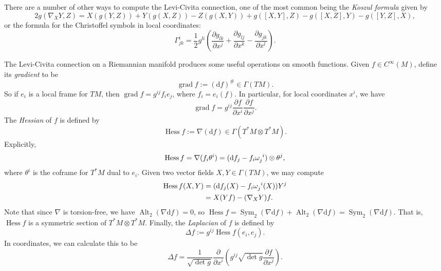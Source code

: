 \documentclass{book}
\renewcommand{\d}{\mathrm{d}}
\newcommand{\parens}[1]{\left( {#1} \right)}
\newcommand{\pdv}[2]{\frac{\partial{#1}}{\partial{#2}}}
\DeclareMathOperator{\Alt}{\mathrm{Alt}}
\DeclareMathOperator{\Sym}{\mathrm{Sym}}
\DeclareMathOperator{\grad}{\mathrm{grad}}
\DeclareMathOperator{\Hess}{\mathrm{Hess}}
\theoremstyle{definition}
\numberwithin{equation}{section}
\begin{document}
There are a number of other ways to compute the Levi-Civita connection, one of the most common being the \textit{Koszul formula} given by 
\begin{equation}
    2g(\nabla_X Y,Z) = X(g(Y,Z)) + Y(g(X,Z)) - Z(g(X,Y)) + g([X,Y],Z) - g([X,Z],Y) - g([Y,Z],X),
\end{equation}
or the formula for the Christoffel symbols in local coordinates:
\begin{equation}
    \Gamma_{jk}^i = \frac{1}{2} g^{li} \parens{ \pdv{g_{lk}}{x^j} + \pdv{g_{lj}}{x^k} - \pdv{g_{jk}}{x^l} }.
\end{equation}

The Levi-Civita connection on a Riemannian manifold produces some useful operations on smooth functions. Given $f \in C^\infty(M)$, define its \textit{gradient} to be
\begin{equation}
    \grad{f} := (\d f)^\# \in \Gamma(TM).
\end{equation}
So if $e_i$ is a local frame for $TM$, then $\grad{f} = g^{ij} f_i e_j$, where $f_i = e_i(f)$. In particular, for local coordinates $x^i$, we have 
\begin{equation}
    \grad{f} = g^{ij} \pdv{f}{x^i} \pdv{f}{x^j}.
\end{equation}
The \textit{Hessian} of $f$ is defined by
\begin{equation}
    \Hess{f} := \nabla(\d f) \in \Gamma(T^*M \otimes T^*M).
\end{equation}
Explicitly,
\begin{equation}
    \Hess{f} = \nabla(f_i \theta^i) = (\d{f_j} - f_i \tensor{\omega}{_j^i}) \otimes \theta^j,
\end{equation}
where $\theta^i$ is the coframe for $T^*M$ dual to $e_i$. Given two vector fields $X,Y \in \Gamma(TM)$, we may compute 
\begin{equation} \begin{aligned}
    \Hess{f}(X,Y) &= ( \d{f_j}(X) - f_i \tensor{\omega}{_j^i}(X) ) Y^j \\
                  &= X(Yf) - (\nabla_X Y)f.
\end{aligned} \end{equation}
Note that since $\nabla$ is torsion-free, we have $\Alt_2(\nabla\d{f}) = 0$, so $\Hess{f} = \Sym_2(\nabla\d{f}) + \Alt_2(\nabla\d{f}) = \Sym_2(\nabla\d{f})$. That is, $\Hess{f}$ is a symmetric section of $T^*M \otimes T^*M$. Finally, the \textit{Laplacian} of $f$ is defined by 
\begin{equation}
    \Delta f := g^{ij} \Hess{f}(e_i,e_j).
\end{equation}
In coordinates, we can calculate this to be 
\begin{equation}
    \Delta f = \frac{1}{\sqrt{\det{g}}} \pdv{}{x^i} \parens{ g^{ij} \sqrt{\det{g}} \pdv{f}{x^j} }.
\end{equation}
\end{document}
